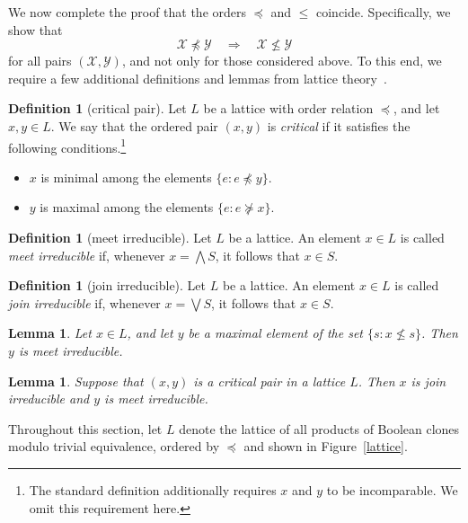 \documentclass{amsart}
\numberwithin{equation}{section}
\theoremstyle{plain}
\newtheorem{lemma}[theorem]{Lemma}
\theoremstyle{definition}
\newtheorem{definition}[theorem]{Definition}
\def\clone#1{\mathcal{#1}}
\begin{document}
We now complete the proof that the orders $\preceq$ and $\leq$ coincide.  Specifically, we show that
$$\clone{X}\not\preceq\clone{Y}\quad\Rightarrow\quad\clone{X}\not\leq\clone{Y}$$
for all pairs $(\clone{X},\clone{Y})$, and not only for those considered above. To this end, we require a few additional definitions and lemmas from lattice theory~\cite{trotter}.

\begin{definition}[critical pair] Let $L$ be a lattice with order relation $\preceq$, and let $x,y\in L$. We say that the ordered pair $(x,y)$ is {\em critical} if it satisfies the following conditions.\footnote{The standard definition additionally requires $x$ and $y$ to be incomparable. We omit this requirement here.}
\begin{itemize}
\item $x$ is minimal among the elements $\{e: e\not\preceq y\}$.
\item $y$ is maximal among the elements $\{e: e\not\succeq x\}$.
\end{itemize}
\end{definition}

\begin{definition}[meet irreducible] Let $L$ be a lattice. An element $x\in L$ is called {\em meet irreducible} if, whenever $x=\bigwedge S$, it follows that $x\in S$.
\end{definition}

\begin{definition}[join irreducible] Let $L$ be a lattice. An element $x\in L$ is called {\em join irreducible} if, whenever $x=\bigvee S$, it follows that $x\in S$.
\end{definition}

\begin{lemma}
\label{meet-irred}
  Let $x\in L$, and let $y$ be a maximal element of the set $\{s:x\not\leq s\}$. Then $y$ is meet irreducible.
\end{lemma}

\begin{lemma} 
\label{critical}
  Suppose that $(x,y)$ is a critical pair in a lattice $L$. Then $x$ is join irreducible and $y$ is meet irreducible.
\end{lemma}

Throughout this section, let $L$ denote the lattice of all products of Boolean clones modulo trivial equivalence, ordered by $\preceq$ and shown in Figure~\ref{lattice}.
\end{document}
